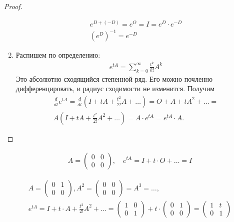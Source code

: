 \begin{proof}
\begin{enumerate}
            \begin{gather*}
                e^{D + (-D)} = e^{O} = I = e^D \cdot e^{-D} \\
                (e^D)^{-1} = e^{-D}
            \end{gather*}
        \item Распишем по определению:
            \begin{gather*}
                e^{tA} = \sum\limits_{k = 0}^{\infty} \frac{t^k}{k!} A^k
            \end{gather*}
            Это абсолютно сходящийся степенной ряд.
            Его можно почленно дифференцировать, и радиус сходимости не изменится.
            Получим
            \begin{gather*}
                \frac{d}{dt} e^{tA} = 
                \frac{d}{dt} ( I + tA + \frac{t^2}{2!} A + \ldots ) =
                O + A + tA^2 + \ldots = \\
                A(I + tA + \frac{t^2}{2!}A^2 + \ldots) = 
                A \cdot e^{tA} = 
                e^{tA} \cdot A.
            \end{gather*}
    \end{enumerate}
\end{proof}

\begin{exmp}
    \begin{gather*}
        A = \left( \begin{matrix}
            0 & 0 \\
            0 & 0
        \end{matrix} \right), \quad 
        e^{tA} = I + t \cdot O + \ldots = I
    \end{gather*}
\end{exmp}

\begin{exmp}
    \begin{gather*}
        A = \left( \begin{matrix}
            0 & 1 \\
            0 & 0
        \end{matrix} \right),
        A^2 = \left( \begin{matrix}
            0 & 0 \\
            0 & 0
        \end{matrix} \right) = A^3 = \ldots, \\
        e^{tA} = I + t \cdot A + \frac{t^2}{2!} A^2 + \ldots  =
        \left( \begin{matrix}
            1 & 0 \\
            0 & 1
        \end{matrix} \right) + t \cdot \left( \begin{matrix}
            0 & 1 \\
            0 & 0
        \end{matrix} \right) = 
        \left( \begin{matrix}
            1 & t \\
            0 & 1
        \end{matrix} \right)
    \end{gather*}
\end{exmp}


